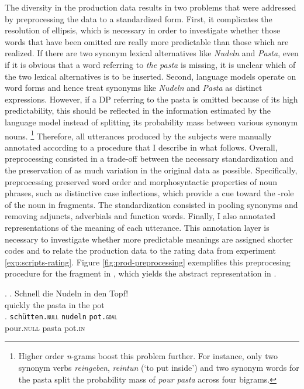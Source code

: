 The diversity in the production data results in two problems that were addressed by preprocessing the data to a standardized form. First, it complicates the resolution of ellipsis, which is necessary in order to investigate whether those words that have been omitted are really more predictable than those which are realized. If there are two synonym lexical alternatives like \textit{Nudeln} and \textit{Pasta}, even if it is obvious that a word referring to \textit{the pasta} is missing, it is unclear which of the two lexical alternatives is to be inserted. Second, language models operate on word forms and hence treat synonyms like \textit{Nudeln} and \textit{Pasta} as distinct expressions. However, if a DP referring to the pasta is omitted because of its high predictability, this should be reflected in the information estimated by the language model instead of splitting its probability mass between various synonym nouns.%
%
\footnote{Higher order \textit{n}-grams boost this problem further. For instance, only two synonym verbs \textit{reingeben}, \textit{reintun} (`to put inside') and two synonym words for the pasta split the probability mass of \textit{pour pasta} across four bigrams.}\afterfn%
%
Therefore, all utterances produced by the subjects were manually annotated according to a procedure that I describe in what follows. Overall, preprocessing consisted in a trade-off between the necessary standardization and the preservation of as much variation in the original data as possible. Specifically, preprocessing preserved word order and morphosyntactic properties of noun phrases, such as distinctive case inflections, which provide a cue toward the \texttheta-role of the noun in fragments. The standardization consisted in pooling synonyms and removing adjuncts, adverbials and function words. Finally, I also annotated representations of the meaning of each utterance. This annotation layer is necessary to investigate whether more predictable meanings are assigned shorter codes and to relate the production data to the rating data from experiment \ref{exp:scripts-rating}. Figure \ref{fig:prod-preprocessing} exemplifies this preprocesing procedure for the fragment in \Next[a], which yields the abstract representation in \Next[b].

\ex. \ag. Schnell die Nudeln in den Topf!\\
	  quickly the pasta in the pot\\
     \bg. \texttt{schütten.\textsc{null}} \texttt{nudeln} \texttt{pot.\textsc{goal}}\\
	pour.\textsc{null} pasta pot.\textsc{in}\\


